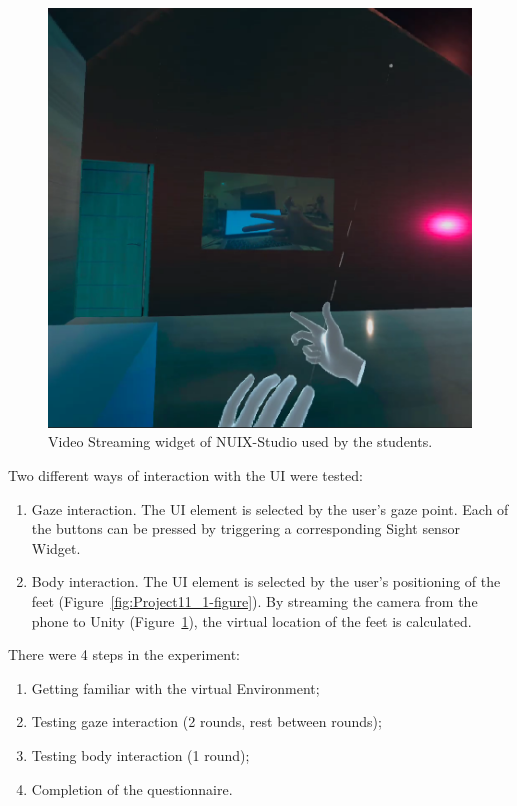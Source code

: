 \begin{figure}
  \centering
  \includegraphics[width=0.9\linewidth]{figures/VideoStreamingWidget.png}
  \caption{Video Streaming widget of NUIX-Studio used by the students.}
  \label{fig:VideoStreamingWidget-figure}
\end{figure}

Two different ways of interaction with the UI were tested:
\begin{enumerate}
    \item Gaze interaction. The UI element is selected by the user's gaze point. Each of the buttons can be pressed by triggering a corresponding Sight sensor Widget.
    \item Body interaction. The UI element is selected by the user's positioning of the feet (Figure~\ref{fig:Project11_1-figure}). By streaming the camera from the phone to Unity (Figure~\ref{fig:VideoStreamingWidget-figure}), the virtual location of the feet is calculated.

\end{enumerate}

There were 4 steps in the experiment:
\begin{enumerate}
    \item Getting familiar with the virtual Environment;
    \item Testing gaze interaction (2 rounds, rest between rounds);
    \item Testing body interaction (1 round);
    \item Completion of the questionnaire.
\end{enumerate}

